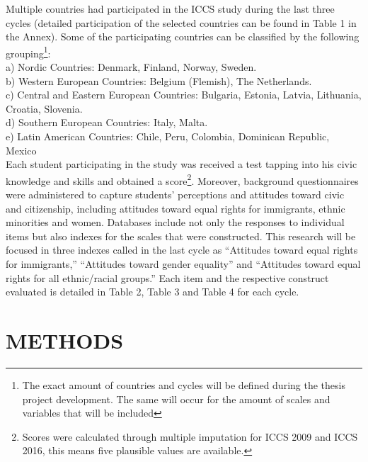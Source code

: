 \documentclass[
  11pt,
]{article}
\begin{document}
Multiple countries had participated in the ICCS study during the last
three cycles (detailed participation of the selected countries can be
found in Table 1 in the Annex). Some of the participating countries can
be classified by the following grouping\footnote{The exact amount of
  countries and cycles will be defined during the thesis project
  development. The same will occur for the amount of scales and
  variables that will be included}:\\
\newline  a) Nordic Countries: Denmark, Finland, Norway, Sweden.\\
b) Western European Countries: Belgium (Flemish), The Netherlands.\\
c) Central and Eastern European Countries: Bulgaria, Estonia, Latvia,
Lithuania, Croatia, Slovenia.\\
d) Southern European Countries: Italy, Malta.\\
e) Latin American Countries: Chile, Peru, Colombia, Dominican Republic,
Mexico\\
\newline  Each student participating in the study was received a test
tapping into his civic knowledge and skills and obtained a
score\footnote{Scores were calculated through multiple imputation for
  ICCS 2009 and ICCS 2016, this means five plausible values are
  available.}. Moreover, background questionnaires were administered to
capture students' perceptions and attitudes toward civic and
citizenship, including attitudes toward equal rights for immigrants,
ethnic minorities and women. Databases include not only the responses to
individual items but also indexes for the scales that were constructed.
This research will be focused in three indexes called in the last cycle
as ``Attitudes toward equal rights for immigrants,'' ``Attitudes toward
gender equality'' and ``Attitudes toward equal rights for all
ethnic/racial groups.'' Each item and the respective construct evaluated
is detailed in Table 2, Table 3 and Table 4 for each cycle.

\hypertarget{methods}{%
\section{METHODS}\label{methods}}
\end{document}
